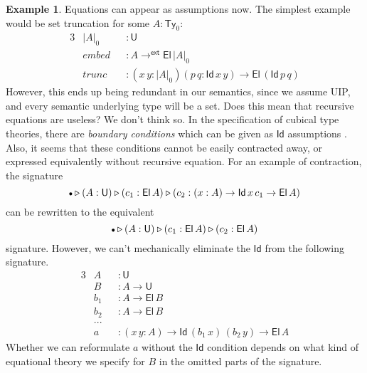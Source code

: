 \documentclass[12pt,a4paper,twoside,openany]{book}
\theoremstyle{remark}
\theoremstyle{definition}
\newtheorem{myexample}{Example}
\theoremstyle{theorem}
\newcommand{\mi}[1]{\mathit{#1}}
\newcommand{\ms}[1]{\mathsf{#1}}
\newcommand{\Ty}{\mathsf{Ty}}
\newcommand{\U}{\mathsf{U}}
\newcommand{\El}{\mathsf{El}}
\newcommand{\Id}{\mathsf{Id}}
\newcommand{\ext}{\triangleright}
\newcommand{\emptycon}{\scaleobj{.75}\bullet}
\newcommand{\toe}{\to^{\ms{ext}}}
\begin{document}
\begin{myexample} Equations can appear as assumptions now. The simplest
example would be set truncation for some $A : \Ty_0$:
\begin{alignat*}{3}
  &|A|_0      &&: \U\\
  &\mi{embed} &&: A \toe \El\,|A|_0 \\
  &\mi{trunc} &&: (x\,y : |A|_0)(p\,q : \Id\,x\,y) \to \El\,(\Id\,p\,q)
\end{alignat*}
However, this ends up being redundant in our semantics, since we assume UIP,
and every semantic underlying type will be a set. Does this mean that recursive
equations are useless? We don't think so. In the specification of cubical type
theories, there are \emph{boundary conditions} which can be given as $\Id$
assumptions \cite{cchm,angiuli2016computational,angiuli2018cartesian}. Also, it
seems that these conditions cannot be easily contracted away, or expressed
equivalently without recursive equation. For an example of contraction, the
signature
\[\emptycon \ext (A : \U) \ext (c_1 : \El\,A) \ext (c_2 : (x : A) \to \Id\,x\,c_1 \to \El\,A)\]
can be rewritten to the equivalent
\[\emptycon \ext (A : \U) \ext (c_1 : \El\,A) \ext (c_2 : \El\,A)\]
signature. However, we can't mechanically eliminate the $\Id$ from the following signature.
\begin{alignat*}{3}
  &A   &&: \U\\
  &B   &&: A \to \U\\
  &b_1 &&: A \to \El\,B\\
  &b_2 &&: A \to \El\,B\\
  &...&&\\
  &a   &&: (x\,y : A) \to \Id\,(b_1\,x)\,(b_2\,y) \to \El\,A
\end{alignat*}
Whether we can reformulate $a$ without the $\Id$ condition depends on what kind
of equational theory we specify for $B$ in the omitted parts of the signature.
\end{myexample}
\end{document}
